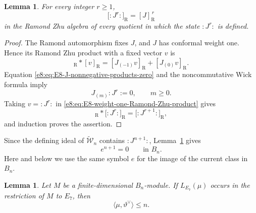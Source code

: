 \documentclass[11pt,reqno]{amsart}
\newtheorem{lemma}[theorem]{Lemma}
\theoremstyle{definition}
\theoremstyle{remark}
\providecommand{\W}{\mathcal{W}}
\begin{document}
\begin{lemma}
\label{e8:lem:E8-Zhu-image-normal-power}
For every integer $r\ge1$,
\begin{equation*}
  \bigl[:J^r:\bigr]_{\mathrm R}
  =[J]_{\mathrm R}^{\,r}
\end{equation*}
in the Ramond Zhu algebra of every quotient in which the state
$:J^r:$ is defined.
\end{lemma}

\begin{proof}
The Ramond automorphism fixes $J$, and $J$ has conformal weight one.  Hence
its Ramond Zhu product with a fixed vector $v$ is
\begin{equation}
  [J]_{\mathrm R}*[v]_{\mathrm R}
  =[J_{(-1)}v]_{\mathrm R}+[J_{(0)}v]_{\mathrm R}.
  \label{e8:eq:E8-weight-one-Ramond-Zhu-product}
\end{equation}
Equation \eqref{e8:eq:E8-J-nonnegative-products-zero} and the noncommutative
Wick formula imply
\begin{equation*}
  J_{(m)}:J^r:=0,
  \qquad m\ge0.
\end{equation*}
Taking $v=:J^r:$ in
\eqref{e8:eq:E8-weight-one-Ramond-Zhu-product} gives
\begin{equation*}
  [J]_{\mathrm R}*\bigl[:J^r:\bigr]_{\mathrm R}
  =\bigl[:J^{r+1}:\bigr]_{\mathrm R},
\end{equation*}
and induction proves the assertion.
\end{proof}

Since the defining ideal of $\widetilde{\W}_n$ contains
$:J^{n+1}:$, Lemma~\ref{e8:lem:E8-Zhu-image-normal-power} gives
\begin{equation}
  e^{n+1}=0
  \qquad\text{in }B_n.
  \label{e8:eq:E8-highest-root-nilpotency-Bn}
\end{equation}
Here and below we use the same symbol $e$ for the image of the current class
in $B_n$.

\begin{lemma}
\label{e8:lem:E8-Bn-constituent-level-bound}
Let $M$ be a finite-dimensional $B_n$-module.  If
$L_{E_7}(\mu)$ occurs in the restriction of $M$ to $E_7$, then
\begin{equation}
  \langle\mu,\vartheta^{\vee}\rangle\le n.
  \label{e8:eq:E8-Bn-constituent-level-bound}
\end{equation}
\end{lemma}
\end{document}
